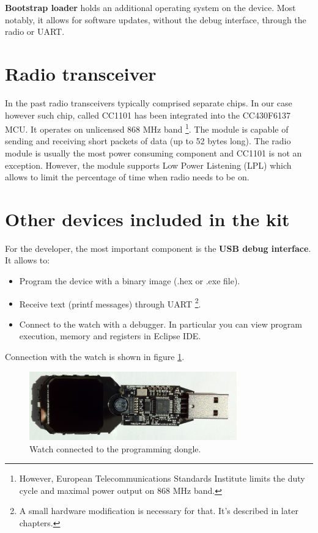 {\bf Bootstrap loader} holds an additional operating system on the
device.  Most notably, it allows for software updates, without the
debug interface, through the radio or UART.

\section{Radio transceiver}

In the past radio transceivers typically comprised separate chips. In
our case however such chip, called CC1101 has been integrated into the
CC430F6137 MCU.  It operates on unlicensed 868 MHz band
\footnote{However, European Telecommunications Standards Institute
limits the duty cycle and maximal power output on 868 MHz band.}.  The
module is capable of sending and receiving short packets of data (up
to 52 bytes long).  The radio module is usually the most power
consuming component and CC1101 is not an exception.  However, the
module supports Low Power Listening (LPL) which allows to limit the
percentage of time when radio needs to be on.

\section{Other devices included in the kit}
For the developer, the most important component is the {\bf USB debug
interface}. It allows to:
\begin{itemize}
  \item Program the device with a binary image (.hex or .exe file).
  \item Receive text (printf messages) through UART \footnote{A small
    hardware modification is necessary for that. It's described in
    later chapters.}.
  \item Connect to the watch with a debugger. In particular you can
    view program execution, memory and registers in Eclipse IDE.
\end{itemize}
Connection with the watch is shown in figure \ref{fig:chronos_dongle}.

\begin{figure}[h]
  \centering
  \includegraphics[width=0.8\textwidth]{img/chronos_dongle.jpg}
  \caption{Watch connected to the programming dongle.}
  \label{fig:chronos_dongle}
\end{figure}

